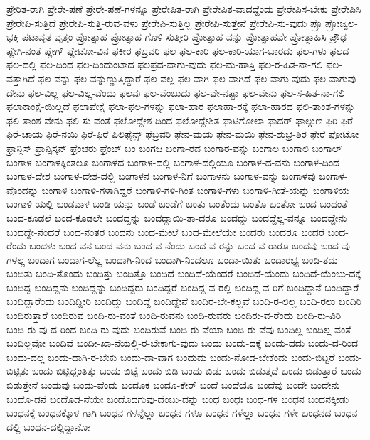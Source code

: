 {ಪ್ರೇರಿತ-ರಾಗಿ
ಪ್ರೇರೇ-ಪಣೆ
ಪ್ರೇರೇ-ಪಣೆ-ಗಳನ್ನೂ
ಪ್ರೇರೇಪಿತ-ರಾಗಿ
ಪ್ರೇರೇಪಿತ-ವಾದದ್ದೆಂದು
ಪ್ರೇರೇಪಿಸ-ಬೇಕು
ಪ್ರೇರೇಪಿಸಿ
ಪ್ರೇರೇಪಿ-ಸುತ್ತಿದೆ
ಪ್ರೇರೇಪಿ-ಸುತ್ತಿ-ರುವ-ವಳು
ಪ್ರೇರೇಪಿ-ಸುತ್ತಿಲ್ಲ
ಪ್ರೇರೇಪಿ-ಸುತ್ತೇನೆ
ಪ್ರೇರೇಪಿ-ಸು-ವುದು
ಪ್ರೊ
ಪ್ರೋಜ್ವಲ-ಭಕ್ತಿ-ಪಟಾವೃತ-ವೃತ್ತಂ
ಪ್ರೋತ್ಸಾಹ
ಪ್ರೋತ್ಸಾಹ-ಗೊಳಿ-ಸುತ್ತೀರಿ
ಪ್ರೋತ್ಸಾಹ-ವನ್ನು
ಪ್ರೋತ್ಸಾಹವೇ
ಪ್ರೋತ್ಸಾಹಿಸಿ
ಪ್ರೌಢ
ಪ್ಲೇಗಿ-ನಂತೆ
ಪ್ಲೇಗ್
ಪ್ಲೇಟೋ-ವಿನ
ಫಕೀರ
ಫಬ್ರವರಿ
ಫಲ
ಫಲ-ಕಾರಿ
ಫಲ-ಕಾರಿ-ಯಾಗ-ಬಾರದು
ಫಲ-ಗಳು
ಫಲದ
ಫಲ-ದಲ್ಲಿ
ಫಲ-ದಿಂದ
ಫಲ-ದಿಂದುಂಟಾದ
ಫಲಪ್ರದ-ವಾಗು-ವುದು
ಫಲ-ಮ-ಹಾಸ್ತಿ
ಫಲ-ರ-ಹಿತ-ನಾ-ಗಲಿ
ಫಲ-ವತ್ತಾಗಿದೆ
ಫಲ-ವನ್ನು
ಫಲ-ವನ್ನುಣ್ಣುತ್ತಿದ್ದಾರೆ
ಫಲ-ವಲ್ಲ
ಫಲ-ವಾಗಿ
ಫಲ-ವಾಗಿದೆ
ಫಲ-ವಾಗು-ವುದು
ಫಲ-ವಾಗುವು-ದೇನು
ಫಲ-ವಿಲ್ಲ
ಫಲ-ವಿಲ್ಲ-ವೆಂದು
ಫಲವು
ಫಲ-ವೆಂಬುದು
ಫಲ-ವೇ-ನಪ್ಪಾ
ಫಲ-ವೇನು
ಫಲ-ಸ-ಹಿತ-ನಾ-ಗಲಿ
ಫಲಾಕಾಂಕ್ಷೆ-ಯಿಲ್ಲದೆ
ಫಲಾಪೇಕ್ಷೆ
ಫಲಾ-ಫಲ-ಗಳನ್ನು
ಫಲಾ-ಹಾರ
ಫಲಾಹಾ-ರಕ್ಕೆ
ಫಲಾ-ಹಾರದ
ಫಲಿ-ತಾಂಶ-ಗಳನ್ನು
ಫಲಿ-ತಾಂಶ-ವೇನು
ಫಲಿ-ಸು-ವಂತೆ
ಫಲೋದ್ದೇಶ-ದಿಂದ
ಫಲೋದ್ದೇಶಿತ
ಫಾಟಿಗೋಲಾ
ಫಾದರ್
ಫಾಲ್ಗುಣ
ಫಿರಿ
ಫಿರೆ
ಫಿರೆ-ಚಾಯ
ಫಿರೆ-ನಯಿ
ಫಿರೆ-ಫಿರೆ
ಫಿಲಿಫೈನ್ಸ್
ಫೆಬ್ರವರಿ
ಫೇನ-ಮಯ
ಫೇನ-ಮಯಿ
ಫೇನ-ಶುಭ್ರ-ಶಿರ
ಫೇರೆ
ಫೋಟೋ
ಫ್ರಾನ್ಸಿಸ್
ಫ್ರಾನ್ಸಿಸ್ಕನ್
ಫ್ರೆಂಚರು
ಫ್ರೆಂಚ್
ಬಂ
ಬಂಗಜ
ಬಂಗಾ-ರದ
ಬಂಗಾರ-ವನ್ನು
ಬಂಗಾಲ
ಬಂಗಾಲಿ
ಬಂಗಾಲ್
ಬಂಗಾಳ
ಬಂಗಾಳಕ್ಕಿಂತಲೂ
ಬಂಗಾಳದ
ಬಂಗಾಳ-ದಲ್ಲಿ
ಬಂಗಾಳ-ದಲ್ಲಿಯೂ
ಬಂಗಾಳ-ದ-ವನು
ಬಂಗಾಳ-ದಿಂದ
ಬಂಗಾಳ-ದೇಶ
ಬಂಗಾಳ-ದೇಶ-ದಲ್ಲಿ
ಬಂಗಾಳನ
ಬಂಗಾಳ-ನಿಗೆ
ಬಂಗಾಳನು
ಬಂಗಾಳ-ವನ್ನು
ಬಂಗಾಳವು
ಬಂಗಾಳ-ವೊಂದನ್ನು
ಬಂಗಾಳಿ
ಬಂಗಾಳಿ-ಗಳಾಗಿದ್ದರೆ
ಬಂಗಾಳಿ-ಗಳಿ-ಗಿಂತ
ಬಂಗಾಳಿ-ಗಳು
ಬಂಗಾಳಿ-ಗೀತೆ-ಯನ್ನು
ಬಂಗಾಳಿಯ
ಬಂಗಾಳಿ-ಯಲ್ಲಿ
ಬಂಡವಾಳ
ಬಂಡಿ-ಯನ್ನು
ಬಂಡೆ
ಬಂಡೆಗೆ
ಬಂತು
ಬಂತೆಂದು
ಬಂತೊ
ಬಂತೋ
ಬಂದ
ಬಂದಂತೆ
ಬಂದ-ಕೂಡಲೆ
ಬಂದ-ಕೂಡಲೇ
ಬಂದದ್ದನ್ನು
ಬಂದದ್ದಾಯಿ-ತಾ-ದರೂ
ಬಂದದ್ದು
ಬಂದದ್ದೆಲ್ಲ-ವನ್ನೂ
ಬಂದದ್ದೇನು
ಬಂದದ್ದೇ-ನೆಂದರೆ
ಬಂದ-ನಂತರ
ಬಂದನು
ಬಂದ-ಮೇಲೆ
ಬಂದ-ಮೇಲೆಯೇ
ಬಂದರು
ಬಂದರೂ
ಬಂದರೆ
ಬಂದ-ರೆಂದು
ಬಂದಳು
ಬಂದ-ವನ
ಬಂದ-ವನು
ಬಂದ-ವ-ನೆಂದು
ಬಂದ-ವ-ರನ್ನು
ಬಂದ-ವ-ರಾರೂ
ಬಂದವು
ಬಂದ-ವು-ಗಳಲ್ಲ
ಬಂದಾಗ
ಬಂದಾಗ-ಲೆಲ್ಲ
ಬಂದಾಗಿ-ನಿಂದ
ಬಂದಾಗಿ-ನಿಂದಲೂ
ಬಂದಾ-ಯಿತು
ಬಂದಾರಭ್ಯ
ಬಂದಿ-ತದು
ಬಂದಿತು
ಬಂದಿ-ತೊಂದು
ಬಂದಿತ್ತು
ಬಂದಿತ್ತೊ
ಬಂದಿದೆ
ಬಂದಿದೆ-ಯೆಂದರೆ
ಬಂದಿದೆ-ಯೆಂದು
ಬಂದಿದೆ-ಯೆಂಬು-ದಕ್ಕೆ
ಬಂದಿದ್ದ
ಬಂದಿದ್ದನು
ಬಂದಿದ್ದನ್ನು
ಬಂದಿದ್ದರು
ಬಂದಿದ್ದರೆ
ಬಂದಿದ್ದ-ವ-ರಲ್ಲಿ
ಬಂದಿದ್ದ-ವ-ರಿಗೆ
ಬಂದಿದ್ದಾನೆ
ಬಂದಿದ್ದಾರೆ
ಬಂದಿದ್ದಾರೆಂದು
ಬಂದಿದ್ದೀರಿ
ಬಂದಿದ್ದು
ಬಂದಿದ್ದೆ
ಬಂದಿದ್ದೇನೆ
ಬಂದಿರ-ಬೇ-ಕಲ್ಲವೆ
ಬಂದಿ-ರ-ಲಿಲ್ಲ
ಬಂದಿ-ರಲು
ಬಂದಿರಿ
ಬಂದಿರುತ್ತಾರೆ
ಬಂದಿರುವ
ಬಂದಿ-ರು-ವಂತೆ
ಬಂದಿ-ರುವನು
ಬಂದಿ-ರುವರು
ಬಂದಿರು-ವ-ರೆಂದು
ಬಂದಿ-ರು-ವಿರಿ
ಬಂದಿ-ರು-ವು-ದ-ರಿಂದ
ಬಂದಿ-ರು-ವುದು
ಬಂದಿರುವೆ
ಬಂದಿ-ರು-ವೆಯಾ
ಬಂದಿ-ರು-ವೆವು
ಬಂದಿಲ್ಲ
ಬಂದಿಲ್ಲ-ವಂತೆ
ಬಂದಿಲ್ಲವೋ
ಬಂದಿವೆ
ಬಂದೀ-ಖಾ-ನೆಯಲ್ಲಿ-ರ-ಬೇಕಾಗು-ವುದು
ಬಂದು
ಬಂದು-ದಕ್ಕೆ
ಬಂದು-ದದು
ಬಂದು-ದ-ರಿಂದ
ಬಂದು-ದಲ್ಲ
ಬಂದು-ದಾಗಿ-ರ-ಬೇಕು
ಬಂದು-ದಾ-ವಾಗ
ಬಂದುದು
ಬಂದು-ನೋಡ-ಬೇಕೆಂದು
ಬಂದು-ಬಿಟ್ಟರೆ
ಬಂದು-ಬಿಟ್ಟಿತು
ಬಂದು-ಬಿಟ್ಟಿದ್ದಂತಿತ್ತು
ಬಂದು-ಬಿಟ್ಟೆ
ಬಂದು-ಬಿಡಿ
ಬಂದು-ಬಿಡು
ಬಂದು-ಬಿಡುತ್ತದೆ
ಬಂದು-ಬಿಡುತ್ತಾರೆ
ಬಂದು-ಬಿಡುತ್ತೇನೆ
ಬಂದುವು
ಬಂದು-ವೆಂದು
ಬಂದೂಕ
ಬಂದೂ-ಕೇರ್
ಬಂದೆ
ಬಂದೆಯೊ
ಬಂದೆವು
ಬಂದೇ
ಬಂದೇನು
ಬಂದೊ-ಡನೆ
ಬಂದೊಡ-ನೆಯೇ
ಬಂದೊದಗುವು-ದೆಂಬು-ದನ್ನು
ಬಂಧ
ಬಂಧಃ
ಬಂಧ-ಗಳ
ಬಂಧನ
ಬಂಧನಕ್ಕೀಡು
ಬಂಧನಕ್ಕೆ
ಬಂಧನಕ್ಕೊಳ-ಗಾಗಿ
ಬಂಧನ-ಗಳನ್ನೆಲ್ಲಾ
ಬಂಧನ-ಗಳೂ
ಬಂಧನ-ಗಳೆಲ್ಲಾ
ಬಂಧನ-ಗಳೇ
ಬಂಧನದ
ಬಂಧನ-ದಲ್ಲಿ
ಬಂಧನ-ದಲ್ಲಿದ್ದಾನೋ
}
